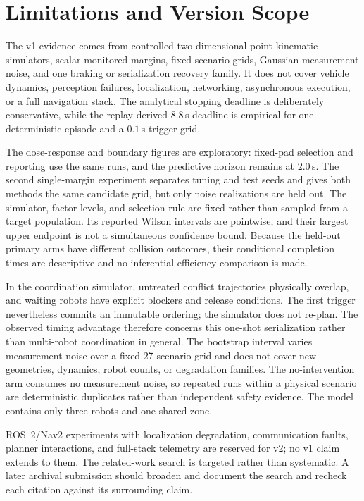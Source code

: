 \section{Limitations and Version Scope}\label{sec:limits}

The v1 evidence comes from controlled two-dimensional point-kinematic simulators, scalar monitored margins, fixed scenario grids, Gaussian measurement noise, and one braking or serialization recovery family. It does not cover vehicle dynamics, perception failures, localization, networking, asynchronous execution, or a full navigation stack. The analytical stopping deadline is deliberately conservative, while the replay-derived $8.8$\,s deadline is empirical for one deterministic episode and a $0.1$\,s trigger grid.

The dose-response and boundary figures are exploratory: fixed-pad selection and reporting use the same runs, and the predictive horizon remains at $2.0$\,s. The second single-margin experiment separates tuning and test seeds and gives both methods the same candidate grid, but only noise realizations are held out. The simulator, factor levels, and selection rule are fixed rather than sampled from a target population. Its reported Wilson intervals are pointwise, and their largest upper endpoint is not a simultaneous confidence bound. Because the held-out primary arms have different collision outcomes, their conditional completion times are descriptive and no inferential efficiency comparison is made.

In the coordination simulator, untreated conflict trajectories physically overlap, and waiting robots have explicit blockers and release conditions. The first trigger nevertheless commits an immutable ordering; the simulator does not re-plan. The observed timing advantage therefore concerns this one-shot serialization rather than multi-robot coordination in general. The bootstrap interval varies measurement noise over a fixed 27-scenario grid and does not cover new geometries, dynamics, robot counts, or degradation families. The no-intervention arm consumes no measurement noise, so repeated runs within a physical scenario are deterministic duplicates rather than independent safety evidence. The model contains only three robots and one shared zone.

ROS~2/Nav2 experiments with localization degradation, communication faults, planner interactions, and full-stack telemetry are reserved for v2; no v1 claim extends to them. The related-work search is targeted rather than systematic. A later archival submission should broaden and document the search and recheck each citation against its surrounding claim.

